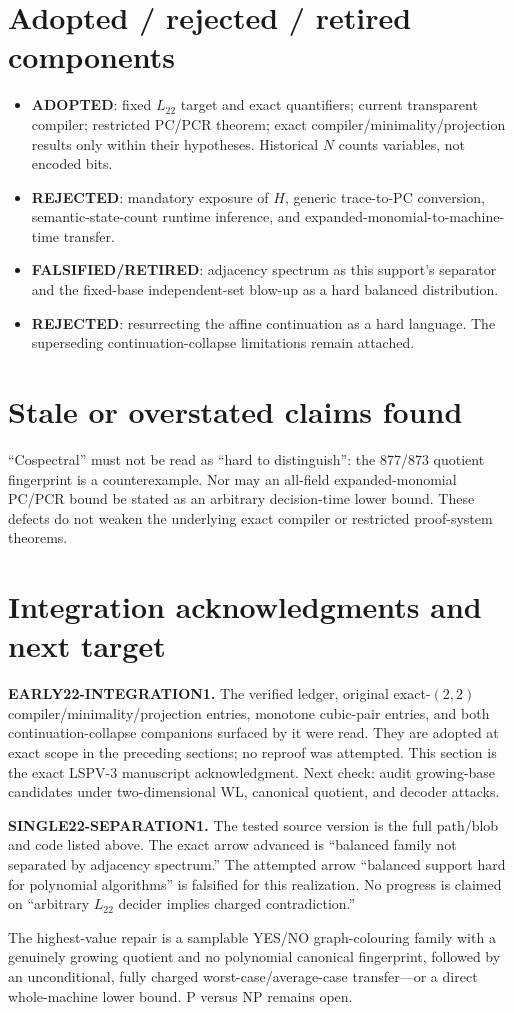\documentclass[11pt]{article}
\newcommand{\Ltw}{L_{22}}
\newcommand{\st}[1]{\textbf{#1}}
\begin{document}
\section{Adopted / rejected / retired components}
\begin{itemize}
\item \st{ADOPTED}: fixed $\Ltw$ target and exact quantifiers; current transparent
compiler; restricted PC/PCR theorem; exact compiler/minimality/projection results only
within their hypotheses.  Historical $N$ counts variables, not encoded bits.
\item \st{REJECTED}: mandatory exposure of $H$, generic trace-to-PC conversion,
semantic-state-count runtime inference, and expanded-monomial-to-machine-time transfer.
\item \st{FALSIFIED/RETIRED}: adjacency spectrum as this support's separator and the
fixed-base independent-set blow-up as a hard balanced distribution.
\item \st{REJECTED}: resurrecting the affine continuation as a hard language.  The
superseding continuation-collapse limitations remain attached.
\end{itemize}

\section{Stale or overstated claims found}
``Cospectral'' must not be read as ``hard to distinguish'': the 877/873 quotient
fingerprint is a counterexample.  Nor may an all-field expanded-monomial PC/PCR bound
be stated as an arbitrary decision-time lower bound.  These defects do not weaken the
underlying exact compiler or restricted proof-system theorems.

\section{Integration acknowledgments and next target}
\textbf{EARLY22-INTEGRATION1.} The verified ledger, original exact-$(2,2)$
compiler/minimality/projection entries, monotone cubic-pair entries, and both
continuation-collapse companions surfaced by it were read.  They are adopted at exact
scope in the preceding sections; no reproof was attempted.  This section is the exact
LSPV-3 manuscript acknowledgment.  Next check: audit growing-base candidates under
two-dimensional WL, canonical quotient, and decoder attacks.

\textbf{SINGLE22-SEPARATION1.} The tested source version is the full path/blob and code
listed above.  The exact arrow advanced is ``balanced family not separated by adjacency
spectrum.''  The attempted arrow ``balanced support hard for polynomial algorithms''
is falsified for this realization.  No progress is claimed on ``arbitrary $\Ltw$
decider implies charged contradiction.''

The highest-value repair is a samplable YES/NO graph-colouring family with a genuinely
growing quotient and no polynomial canonical fingerprint, followed by an unconditional,
fully charged worst-case/average-case transfer---or a direct whole-machine lower bound.
P versus NP remains open.

\end{document}
